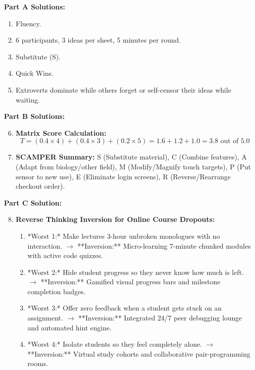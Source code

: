 \begin{solutionbox}
\textbf{Part A Solutions:}
\begin{enumerate}[leftmargin=1.2em, itemsep=2pt]
    \item Fluency.
    \item 6 participants, 3 ideas per sheet, 5 minutes per round.
    \item Substitute (S).
    \item Quick Wins.
    \item Extroverts dominate while others forget or self-censor their ideas while waiting.
\end{enumerate}

\textbf{Part B Solutions:}
\begin{enumerate}[leftmargin=1.2em, itemsep=3pt]
    \setcounter{enumi}{5}
    \item \textbf{Matrix Score Calculation:}
    $$T = (0.4 \times 4) + (0.4 \times 3) + (0.2 \times 5) = 1.6 + 1.2 + 1.0 = \mathbf{3.8} \text{ out of } 5.0$$
    \item \textbf{SCAMPER Summary:} S (Substitute material), C (Combine features), A (Adapt from biology/other field), M (Modify/Magnify touch targets), P (Put sensor to new use), E (Eliminate login screens), R (Reverse/Rearrange checkout order).
\end{enumerate}

\textbf{Part C Solution:}
\begin{enumerate}[leftmargin=1.2em, itemsep=3pt]
    \setcounter{enumi}{7}
    \item \textbf{Reverse Thinking Inversion for Online Course Dropouts:}
    \begin{enumerate}[label=(\roman*)]
        \item *Worst 1:* Make lectures 3-hour unbroken monologues with no interaction. $\rightarrow$ **Inversion:** Micro-learning 7-minute chunked modules with active code quizzes.
        \item *Worst 2:* Hide student progress so they never know how much is left. $\rightarrow$ **Inversion:** Gamified visual progress bars and milestone completion badges.
        \item *Worst 3:* Offer zero feedback when a student gets stuck on an assignment. $\rightarrow$ **Inversion:** Integrated 24/7 peer debugging lounge and automated hint engine.
        \item *Worst 4:* Isolate students so they feel completely alone. $\rightarrow$ **Inversion:** Virtual study cohorts and collaborative pair-programming rooms.
    \end{enumerate}
\end{enumerate}
\end{solutionbox}
